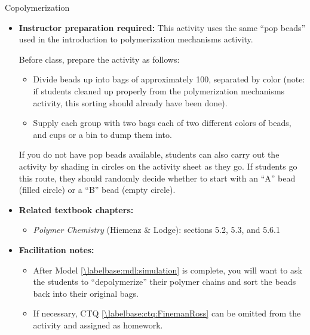 \begin{activity}{Copolymerization}
\begin{instructornotes}
\begin{itemize}
			\emph{Note: Model \ref{\labelbase:mdl:simulation} takes approximately 25 minutes; the activity can be split after this model and completed in a later class period as long as students have completely filled in the CTQs re. the types of polymer sequences observed.}
			
		\item \textbf{Instructor preparation required:} This activity uses the same ``pop beads'' used in the introduction to polymerization mechanisms activity.
		
			Before class, prepare the activity as follows:
				\begin{itemize}
					\item Divide beads up into bags of approximately 100, separated by color (note: if students cleaned up properly from the polymerization mechanisms activity, this sorting should already have been done).
					\item Supply each group with two bags each of two different colors of beads, and cups or a bin to dump them into.
				\end{itemize}
			
			If you do not have pop beads available, students can also carry out the activity by shading in circles on the activity sheet as they go.  If students go this route, they should randomly decide whether to start with an ``A'' bead (filled circle) or a ``B'' bead (empty circle).
			
		\item \textbf{Related textbook chapters:}
			\begin{itemize}
				\item \emph{Polymer Chemistry} (Hiemenz \& Lodge): sections 5.2, 5.3, and 5.6.1
			\end{itemize}
			
		\item \textbf{Facilitation notes:}
			\begin{itemize}
				\item After Model \ref{\labelbase:mdl:simulation} is complete, you will want to ask the students to ``depolymerize'' their polymer chains and sort the beads back into their original bags.
				\item If necessary, CTQ \ref{\labelbase:ctq:FinemanRoss} can be omitted from the activity and assigned as homework.
			\end{itemize}
	\end{itemize}
	
\end{instructornotes}



\end{activity}
